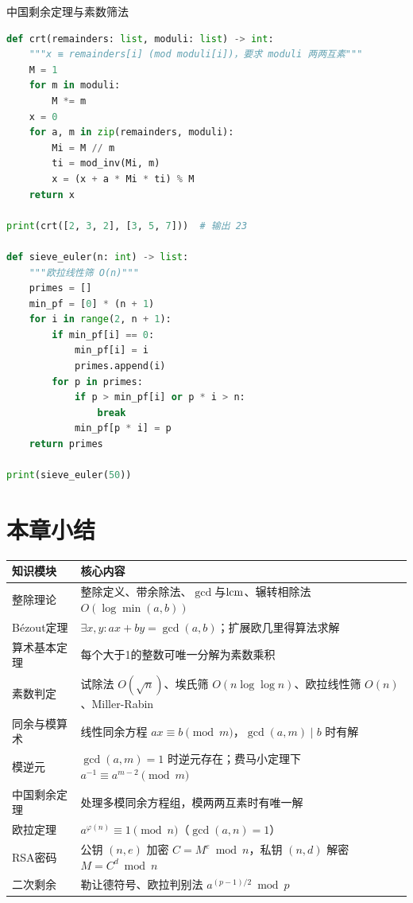\begin{mycode}{中国剩余定理与素数筛法}
\begin{lstlisting}[language=Python]
def crt(remainders: list, moduli: list) -> int:
    """x ≡ remainders[i] (mod moduli[i])，要求 moduli 两两互素"""
    M = 1
    for m in moduli:
        M *= m
    x = 0
    for a, m in zip(remainders, moduli):
        Mi = M // m
        ti = mod_inv(Mi, m)
        x = (x + a * Mi * ti) % M
    return x

print(crt([2, 3, 2], [3, 5, 7]))  # 输出 23

def sieve_euler(n: int) -> list:
    """欧拉线性筛 O(n)"""
    primes = []
    min_pf = [0] * (n + 1)
    for i in range(2, n + 1):
        if min_pf[i] == 0:
            min_pf[i] = i
            primes.append(i)
        for p in primes:
            if p > min_pf[i] or p * i > n:
                break
            min_pf[p * i] = p
    return primes

print(sieve_euler(50))
\end{lstlisting}
\end{mycode}

\section*{本章小结}

\begin{table}[H]
\centering
\begin{tabular}{lp{10cm}}
\toprule
知识模块 & 核心内容 \\
\midrule
整除理论 & 整除定义、带余除法、\(\gcd\)与\(\operatorname{lcm}\)、辗转相除法 \(O(\log\min(a,b))\) \\
B\'{e}zout定理 & \(\exists x,y: ax+by=\gcd(a,b)\)；扩展欧几里得算法求解 \\
算术基本定理 & 每个大于1的整数可唯一分解为素数乘积 \\
素数判定 & 试除法 \(O(\sqrt{n})\)、埃氏筛 \(O(n\log\log n)\)、欧拉线性筛 \(O(n)\)、Miller-Rabin \\
同余与模算术 & 线性同余方程 \(ax\equiv b\pmod{m}\)，\(\gcd(a,m)\mid b\) 时有解 \\
模逆元 & \(\gcd(a,m)=1\) 时逆元存在；费马小定理下 \(a^{-1}\equiv a^{m-2}\pmod{m}\) \\
中国剩余定理 & 处理多模同余方程组，模两两互素时有唯一解 \\
欧拉定理 & \(a^{\varphi(n)}\equiv1\pmod{n}\)（\(\gcd(a,n)=1\)） \\
RSA密码 & 公钥 \((n,e)\) 加密 \(C=M^e\bmod n\)，私钥 \((n,d)\) 解密 \(M=C^d\bmod n\) \\
二次剩余 & 勒让德符号、欧拉判别法 \(a^{(p-1)/2}\bmod p\) \\
\bottomrule
\end{tabular}
\end{table}
